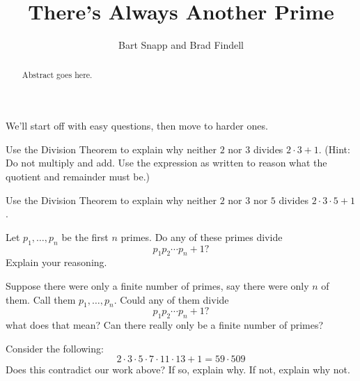 \documentclass{ximera}
\title{There's Always Another Prime}
\author{Bart Snapp and Brad Findell}
\begin{document}
\begin{abstract}
Abstract goes here.  
\end{abstract}
\maketitle

\label{A:Pr}

We'll start off with easy questions, then move to harder ones.  

\begin{problem}
Use the Division Theorem to explain why neither $2$ nor $3$ divides
$2\cdot 3+1$.  (Hint:  Do not multiply and add.  Use the expression 
as written to reason what the quotient and remainder must be.)
\end{problem}

\begin{problem}
Use the Division Theorem to explain why neither $2$ nor $3$ nor $5$ divides
$2\cdot 3\cdot 5+1$.
\end{problem}

\begin{problem} 
Let $p_1,\dots, p_n$ be the first $n$ primes. Do any of these primes divide 
\[
p_1p_2\cdots p_n + 1?
\]
Explain your reasoning.
\end{problem}


\begin{problem} 
Suppose there were only a finite number of primes, say there were only
$n$ of them. Call them $p_1,\dots, p_n$. Could any of them divide
\[
p_1p_2\cdots p_n + 1?
\]
what does that mean? Can there really only be a finite number of
primes?
\end{problem}


\begin{problem} 
Consider the following:
\[
2\cdot 3\cdot 5\cdot 7 \cdot 11\cdot 13 + 1 = 59\cdot 509
\] 
Does this contradict our work above? If so, explain why. If not, explain
why not.
\end{problem}
\end{document}
